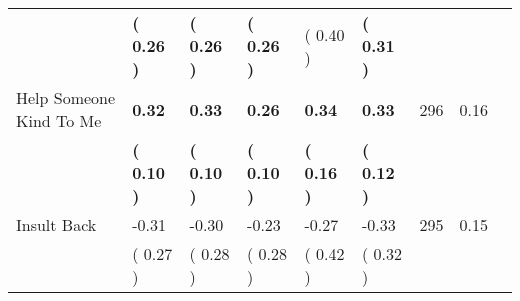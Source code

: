 \begin{tabular}{L{6.2cm} C{1.8cm} C{1.8cm} C{1.8cm} C{1.8cm} C{1.8cm} C{1.8cm} C{0.3cm} C{0.3cm}}
 & \textbf{(     0.26 )} & \textbf{(     0.26 )} & \textbf{(     0.26 )} & (     0.40 ) & \textbf{(     0.31 )}  & \\
Help Someone Kind To Me & \textbf{     0.32} & \textbf{     0.33} & \textbf{     0.26} & \textbf{     0.34} & \textbf{     0.33}  & 296 &       0.16 \\ 
 & \textbf{(     0.10 )} & \textbf{(     0.10 )} & \textbf{(     0.10 )} & \textbf{(     0.16 )} & \textbf{(     0.12 )}  & \\
Insult Back &     -0.31 &     -0.30 &     -0.23 &     -0.27 &     -0.33  & 295 &       0.15 \\ 
 & (     0.27 ) & (     0.28 ) & (     0.28 ) & (     0.42 ) & (     0.32 )  & \\
\bottomrule
\end{tabular}
